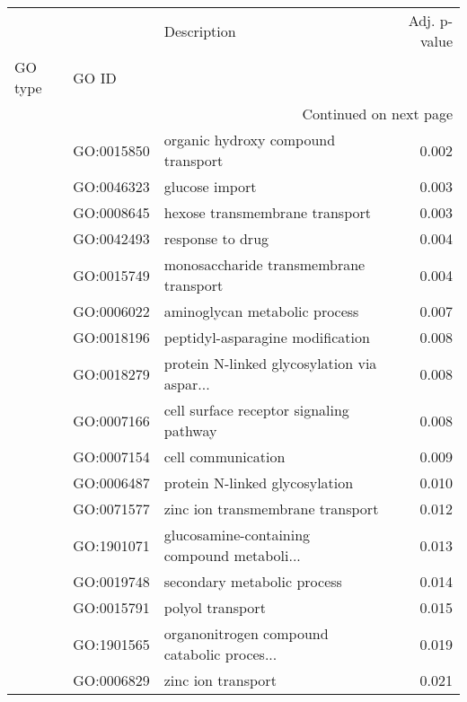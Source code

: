 \begin{longtable}{lllr}
\toprule
   &            &                                  Description &  Adj. p-value \\
GO type & GO ID &                                              &               \\
\midrule
\endhead
\midrule
\multicolumn{4}{r}{{Continued on next page}} \\
\midrule
\endfoot

\bottomrule
\endlastfoot
\multirow{58}{*}{BP} & GO:0015850 &           organic hydroxy compound transport &         0.002 \\
   & GO:0046323 &                               glucose import &         0.003 \\
   & GO:0008645 &               hexose transmembrane transport &         0.003 \\
   & GO:0042493 &                             response to drug &         0.004 \\
   & GO:0015749 &       monosaccharide transmembrane transport &         0.004 \\
   & GO:0006022 &                aminoglycan metabolic process &         0.007 \\
   & GO:0018196 &             peptidyl-asparagine modification &         0.008 \\
   & GO:0018279 &  protein N-linked glycosylation via aspar... &         0.008 \\
   & GO:0007166 &      cell surface receptor signaling pathway &         0.008 \\
   & GO:0007154 &                           cell communication &         0.009 \\
   & GO:0006487 &               protein N-linked glycosylation &         0.010 \\
   & GO:0071577 &             zinc ion transmembrane transport &         0.012 \\
   & GO:1901071 &  glucosamine-containing compound metaboli... &         0.013 \\
   & GO:0019748 &                  secondary metabolic process &         0.014 \\
   & GO:0015791 &                             polyol transport &         0.015 \\
   & GO:1901565 &  organonitrogen compound catabolic proces... &         0.019 \\
   & GO:0006829 &                           zinc ion transport &         0.021 \\

\end{longtable}
